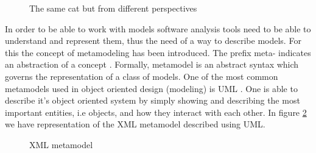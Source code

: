 \begin{figure}
\centering
{}
\caption{The same cat but from different perspectives \cite{figure:CatModel}
\label{fig:CatModel}}
\end{figure}	

	
	In order to be able to work with models software analysis tools need to be able
to understand and represent them, thus the need of a way to describe models. For
this the concept of metamodeling has been introduced. The prefix meta- indicates 
an abstraction of a concept \cite{wiki:meta}. Formally, metamodel is an abstract 
syntax which governs the representation of a class of models. One of the most
common metamodels used in object oriented design (modeling) is UML
\cite{book:UMLDistilled}. One is able to describe it's object oriented system by
simply showing and describing the most important entities, i.e objects, and how
they interact with each other. In  figure \ref{fig:umlMetamodel} we have
representation of the XML metamodel described using UML.

   \begin{figure}
		\centering
		\caption{XML metamodel\label{fig:umlMetamodel}}
	\end{figure}

